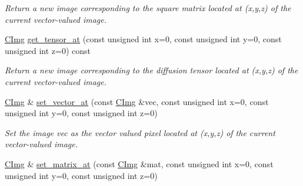 \begin{DoxyCompactItemize}
\begin{DoxyCompactList}\small\item\em Return a new image corresponding to the {\itshape square\/} {\itshape matrix\/} located at ({\ttfamily x},{\ttfamily y},{\ttfamily z}) of the current vector-\/valued image. \item\end{DoxyCompactList}\item 
\hypertarget{structcimg__library_1_1_c_img_ab6b97231d7be6d16aa5d17ad061f99a5}{
\hyperlink{structcimg__library_1_1_c_img}{CImg} \hyperlink{structcimg__library_1_1_c_img_ab6b97231d7be6d16aa5d17ad061f99a5}{get\_\-tensor\_\-at} (const unsigned int x=0, const unsigned int y=0, const unsigned int z=0) const }
\label{structcimg__library_1_1_c_img_ab6b97231d7be6d16aa5d17ad061f99a5}

\begin{DoxyCompactList}\small\item\em Return a new image corresponding to the {\itshape diffusion\/} {\itshape tensor\/} located at ({\ttfamily x},{\ttfamily y},{\ttfamily z}) of the current vector-\/valued image. \item\end{DoxyCompactList}\item 
\hypertarget{structcimg__library_1_1_c_img_a99a89479f6cb8fb4e8e377f71627ba40}{
\hyperlink{structcimg__library_1_1_c_img}{CImg} \& \hyperlink{structcimg__library_1_1_c_img_a99a89479f6cb8fb4e8e377f71627ba40}{set\_\-vector\_\-at} (const \hyperlink{structcimg__library_1_1_c_img}{CImg} \&vec, const unsigned int x=0, const unsigned int y=0, const unsigned int z=0)}
\label{structcimg__library_1_1_c_img_a99a89479f6cb8fb4e8e377f71627ba40}

\begin{DoxyCompactList}\small\item\em Set the image {\ttfamily vec} as the {\itshape vector\/} {\itshape valued\/} pixel located at ({\ttfamily x},{\ttfamily y},{\ttfamily z}) of the current vector-\/valued image. \item\end{DoxyCompactList}\item 
\hypertarget{structcimg__library_1_1_c_img_abb5b9b315b398961953518b7ce4d6673}{
\hyperlink{structcimg__library_1_1_c_img}{CImg} \& \hyperlink{structcimg__library_1_1_c_img_abb5b9b315b398961953518b7ce4d6673}{set\_\-matrix\_\-at} (const \hyperlink{structcimg__library_1_1_c_img}{CImg} \&mat, const unsigned int x=0, const unsigned int y=0, const unsigned int z=0)}
\label{structcimg__library_1_1_c_img_abb5b9b315b398961953518b7ce4d6673}


\end{DoxyCompactItemize}
